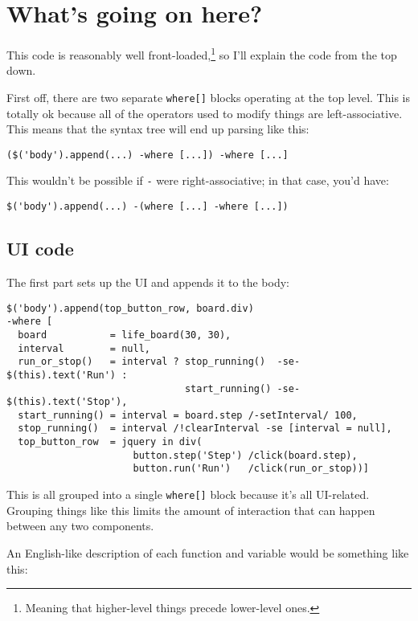 \documentclass{report}
\begin{document}
\section{What's going on here?}
    This code is reasonably well front-loaded,\footnote{Meaning that higher-level things precede lower-level ones.} so I'll explain the code from the top down.

    First off, there are two separate {\tt where[]} blocks operating at the top level. This is totally ok because all of the operators used to modify things are left-associative. This means
    that the syntax tree will end up parsing like this:

\begin{verbatim}
($('body').append(...) -where [...]) -where [...]
\end{verbatim}

    This wouldn't be possible if {\tt -} were right-associative; in that case, you'd have:

\begin{verbatim}
$('body').append(...) -(where [...] -where [...])
\end{verbatim}

\subsection{UI code}
      The first part sets up the UI and appends it to the body:

\begin{verbatim}
$('body').append(top_button_row, board.div)
-where [
  board           = life_board(30, 30),
  interval        = null,
  run_or_stop()   = interval ? stop_running()  -se- $(this).text('Run') :
                               start_running() -se- $(this).text('Stop'),
  start_running() = interval = board.step /-setInterval/ 100,
  stop_running()  = interval /!clearInterval -se [interval = null],
  top_button_row  = jquery in div(
                      button.step('Step') /click(board.step),
                      button.run('Run')   /click(run_or_stop))]
\end{verbatim}

      This is all grouped into a single {\tt where[]} block because it's all UI-related. Grouping things like this limits the amount of interaction that can happen between any two components.

      An English-like description of each function and variable would be something like this:
\end{document}
